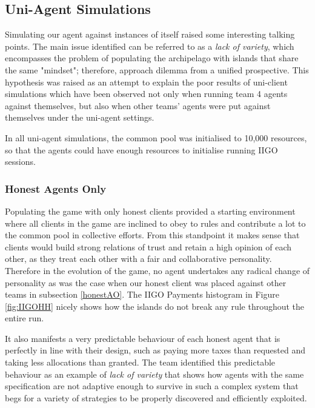 \subsection{Uni-Agent Simulations} \label{againstself}
Simulating our agent against instances of itself raised some interesting talking points. The main issue identified can be referred to as a \emph{lack of variety}, which encompasses the problem of populating the archipelago with islands that share the same "mindset"; therefore, approach dilemma from a unified prospective. This hypothesis was raised as an attempt to explain the poor results of uni-client simulations which have been observed not only when running team 4 agents against themselves, but also when other teams' agents were put against themselves under the uni-agent settings.

In all uni-agent simulations, the common pool was initialised to 10,000 resources, so that the agents could have enough resources to initialise running IIGO sessions.

\subsubsection{Honest Agents Only}
Populating the game with only honest clients provided a starting environment where all clients in the game are inclined to obey to rules and contribute a lot to the common pool in collective efforts. From this standpoint it makes sense that clients would build strong relations of trust and retain a high opinion of each other, as they treat each other with a fair and collaborative personality. Therefore in the evolution of the game, no agent undertakes any radical change of personality as was the case when our honest client was placed against other teams in subsection \ref{honestAO}. The IIGO Payments histogram in Figure \ref{fig:IIGOHH} nicely shows how the islands do not break any rule throughout the entire run.

It also manifests a very predictable behaviour of each honest agent that is perfectly in line with their design, such as paying more taxes than requested and taking less allocations than granted. The team identified this predictable behaviour as an example of \emph{lack of variety} that shows how agents with the same specification are not adaptive enough to survive in such a complex system that begs for a variety of strategies to be properly discovered and efficiently exploited.


